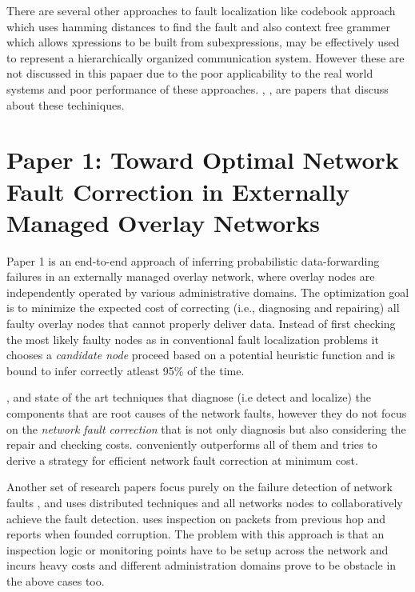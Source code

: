 \documentclass[10pt]{sigplan-proc-varsize}
\begin{document}
There are several other approaches to fault localization like codebook approach which uses hamming distances to find the fault and also context free grammer which allows xpressions to be built from subexpressions, may be effectively used to represent a hierarchically organized communication system. However these are not discussed in this papaer due to the poor applicability to the real world systems and poor performance of these approaches. \cite{Calo:95}, \cite{Kliger:95}, \cite{Yemini:1996} are papers that discuss about these techiniques.

\section{Paper 1: Toward Optimal Network Fault Correction in Externally Managed Overlay Networks}
\cite{pclee:07} Paper 1 is an end-to-end approach of inferring probabilistic data-forwarding failures in an externally managed overlay network, where overlay nodes are independently operated by various administrative domains. The optimization goal is to minimize the expected cost of correcting (i.e., diagnosing and repairing) all faulty overlay nodes that cannot properly deliver data. Instead of first checking the most likely faulty nodes as in conventional fault localization problems it chooses a {\it candidate node} proceed based on a potential heuristic function and is bound to infer correctly atleast 95\% of the time.

\cite{Katzela:95}, \cite{Sethi:04} and \cite{Kandula:05} state of the art techniques that diagnose (i.e detect and localize) the components that are root causes of the network faults, however they do not focus on the {\it network fault correction} that is not only diagnosis but also considering the repair and checking costs. \cite{pclee:07} conveniently outperforms all of them and tries to derive a strategy for efficient network fault correction at minimum cost. 

Another set of research papers focus purely on the failure detection of network faults \cite{Zhuang:05}, \cite{Mizrak:05} and \cite{Avramopoulos:04} uses distributed techniques and all networks nodes to collaboratively achieve the fault detection. \cite{Avramopoulos:04} uses inspection on packets from previous hop and reports when founded corruption. The problem with this approach is that an inspection logic or monitoring points have to be setup across the network and incurs heavy costs and different administration domains prove to be obstacle in the above cases too. 
\end{document}
